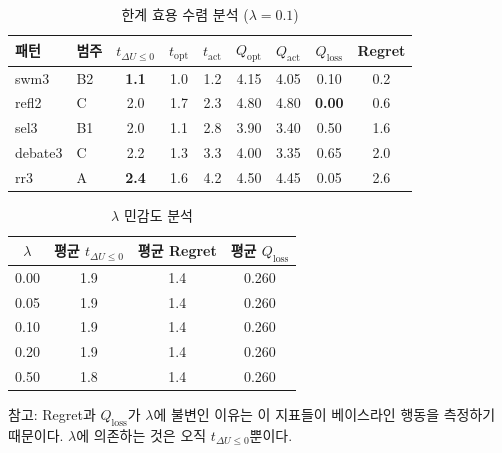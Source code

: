 \documentclass[a4paper,11pt]{article}
\begin{document}
\begin{table}[H]
\centering
\caption{한계 효용 수렴 분석 ($\lambda=0.1$)}
\label{tab:marginal-utility}
{\small
\begin{tabular}{llccccccc}
\toprule
패턴 & 범주 & $t_{\Delta U \leq 0}$ & $t_{\text{opt}}$ & $t_{\text{act}}$ & $Q_{\text{opt}}$ & $Q_{\text{act}}$ & $Q_{\text{loss}}$ & Regret \\
\midrule
swm3    & B2 & \textbf{1.1} & 1.0 & 1.2 & 4.15 & 4.05 & 0.10 & 0.2 \\
refl2   & C  & 2.0          & 1.7 & 2.3 & 4.80 & 4.80 & \textbf{0.00} & 0.6 \\
sel3    & B1 & 2.0          & 1.1 & 2.8 & 3.90 & 3.40 & 0.50 & 1.6 \\
debate3 & C  & 2.2          & 1.3 & 3.3 & 4.00 & 3.35 & 0.65 & 2.0 \\
rr3     & A  & \textbf{2.4} & 1.6 & 4.2 & 4.50 & 4.45 & 0.05 & 2.6 \\
\bottomrule
\end{tabular}
}
\end{table}

\begin{table}[H]
\centering
\caption{$\lambda$ 민감도 분석}
\label{tab:lambda-sensitivity}
{\small
\begin{tabular}{cccc}
\toprule
$\lambda$ & 평균 $t_{\Delta U \leq 0}$ & 평균 Regret & 평균 $Q_{\text{loss}}$ \\
\midrule
0.00 & 1.9 & 1.4 & 0.260 \\
0.05 & 1.9 & 1.4 & 0.260 \\
0.10 & 1.9 & 1.4 & 0.260 \\
0.20 & 1.9 & 1.4 & 0.260 \\
0.50 & 1.8 & 1.4 & 0.260 \\
\bottomrule
\end{tabular}
}

\smallskip
{\footnotesize 참고: Regret과 $Q_{\text{loss}}$가 $\lambda$에 불변인 이유는 이 지표들이 베이스라인 행동을 측정하기 때문이다. $\lambda$에 의존하는 것은 오직 $t_{\Delta U \leq 0}$뿐이다.}
\end{table}
\end{document}
